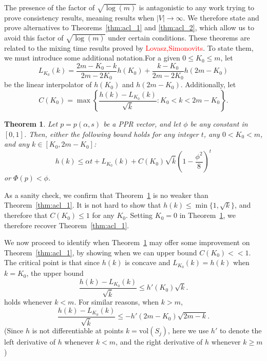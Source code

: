 \documentclass{article}
\newcommand{\abs}[1]{\left \lvert #1 \right \rvert}
\newcommand{\vol}{\mathrm{vol}}
\newcommand{\set}[1]{\left\{#1\right\}}
\newcommand{\1}{\mathbf{1}}
\theoremstyle{alden}
\theoremstyle{aldenthm}
\newtheorem{theorem}{Theorem}
\theoremstyle{remark}
\begin{document}
The presence of the factor of $\sqrt{\log(m)}$ is antagonistic to any work trying to prove consistency results, meaning results when $\abs{V} \to \infty$. We therefore state and prove alternatives to Theorems~\ref{thm:acl_1} and \ref{thm:acl_2}, which allow us to avoid this factor of $\sqrt{\log(m)}$ under certain conditions. These theorems are related to the mixing time results proved by \textcolor{red}{Lovasz,Simonovits}. To state them, we must introduce some additional notation.For a given $0 \leq K_0 \leq m$, let 
\begin{equation*}
L_{K_0}(k) = \frac{2m - K_0 - k}{2m - 2K_0}h(K_0) + \frac{k - K_0}{2m - 2K_0}h(2m - K_0)
\end{equation*}
be the linear interpolator of $h(K_0)$ and $h(2m - K_0)$. Additionally, let
\begin{equation*}
C(K_0) = \max\set{\frac{h(k) - L_{K_0}(k)}{\sqrt{\overline{k}}}: K_0 < k < 2m - K_0}.
\end{equation*}
\begin{theorem}
	\label{thm: mixing_time_PPR}
	Let $p = p(\alpha,s)$ be a PPR vector, and let $\phi$ be any constant in $[0,1]$. Then, either the following bound holds for any integer $t$, any $0 < K_0 < m$, and any $k \in [K_0,2m - K_0]$:
	\begin{equation}
	\label{eqn:mixing_time_PPR}
	h(k) \leq \alpha t + L_{K_0}(k) + C(K_0)\sqrt{\overline{k}}\left(1 - \frac{\phi^2}{8}\right)^t
	\end{equation}
	or $\Phi(p) < \phi$.
\end{theorem}

As a sanity check, we confirm that Theorem~\ref{thm: mixing_time_PPR} is no weaker than Theorem~\ref{thm:acl_1}. It is not hard to show that $h(k) \leq \min\{1,\sqrt{k}\}$, and therefore that $C(K_0) \leq 1$ for any $K_0$. Setting $K_0 = 0$ in Theorem~\ref{thm: mixing_time_PPR}, we therefore recover Theorem~\ref{thm:acl_1}.

We now proceed to identify when Theorem~\ref{thm: mixing_time_PPR} may offer some improvement on Theorem~\ref{thm:acl_1}, by showing when we can upper bound $C(K_0) << 1$. The critical point is that since $h(k)$ is concave and $L_{K_0}(k) = h(k)$ when $k = K_0$, the upper bound
\begin{equation*}
\frac{h(k) - L_{K_0}(k)}{\sqrt{\overline{k}}} \leq h'(K_0) \sqrt{k}.
\end{equation*}
holds whenever $k < m$. For similar reasons, when $k > m$, 
\begin{equation*}
\frac{h(k) - L_{K_0}(k)}{\sqrt{\overline{k}}} \leq -h'(2m - K_0) \sqrt{2m - k}.
\end{equation*} 
(Since $h$ is not differentiable at points $k = \vol(S_j)$, here we use $h'$ to denote the left derivative of $h$ whenever $k < m$, and the right derivative of $h$ whenever $k \geq m$)  
\end{document}
